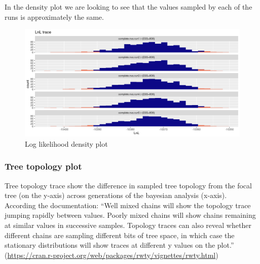 \documentclass[
]{article}
\newenvironment{Shaded}{\begin{snugshade}}{\end{snugshade}}
\newcommand{\AttributeTok}[1]{\textcolor[rgb]{0.77,0.63,0.00}{#1}}
\newcommand{\DecValTok}[1]{\textcolor[rgb]{0.00,0.00,0.81}{#1}}
\newcommand{\FunctionTok}[1]{\textcolor[rgb]{0.00,0.00,0.00}{#1}}
\newcommand{\NormalTok}[1]{#1}
\newcommand{\SpecialCharTok}[1]{\textcolor[rgb]{0.00,0.00,0.00}{#1}}
\newcommand{\StringTok}[1]{\textcolor[rgb]{0.31,0.60,0.02}{#1}}
\begin{document}
In the density plot we are looking to see that the values sampled by
each of the runs is approximately the same.

\begin{figure}
\centering
\includegraphics{LnL_density.png}
\caption{Log likelihood density plot}
\end{figure}

\hypertarget{tree-topology-plot}{%
\subsubsection{Tree topology plot}\label{tree-topology-plot}}

Tree topology trace show the difference in sampled tree topology from
the focal tree (on the y-axis) across generations of the bayesian
analysis (x-axis). According the documentation: ``Well mixed chains will
show the topology trace jumping rapidly between values. Poorly mixed
chains will show chains remaining at similar values in successive
samples. Topology traces can also reveal whether different chains are
sampling different bits of tree space, in which case the stationary
distributions will show traces at different y values on the plot.''
(\url{https://cran.r-project.org/web/packages/rwty/vignettes/rwty.html})

\begin{Shaded}
\end{Shaded}
\end{document}
